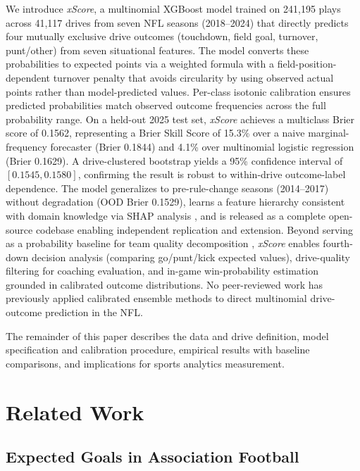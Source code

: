 \documentclass[12pt,a4paper]{article}
\newcommand{\xscore}{\textit{xScore}}
\begin{document}
We introduce \xscore{}, a multinomial XGBoost model trained on 241,195 plays across 41,117 drives from seven NFL seasons (2018--2024) that directly predicts four mutually exclusive drive outcomes (touchdown, field goal, turnover, punt/other) from seven situational features. The model converts these probabilities to expected points via a weighted formula with a field-position-dependent turnover penalty that avoids circularity by using observed actual points rather than model-predicted values. Per-class isotonic calibration ensures predicted probabilities match observed outcome frequencies across the full probability range. On a held-out 2025 test set, \xscore{} achieves a multiclass Brier score of 0.1562, representing a Brier Skill Score of 15.3\% over a naive marginal-frequency forecaster (Brier 0.1844) and 4.1\% over multinomial logistic regression (Brier 0.1629). A drive-clustered bootstrap yields a 95\% confidence interval of $[0.1545, 0.1580]$, confirming the result is robust to within-drive outcome-label dependence. The model generalizes to pre-rule-change seasons (2014--2017) without degradation (OOD Brier 0.1529), learns a feature hierarchy consistent with domain knowledge via SHAP analysis \citep{lundberg2017shap}, and is released as a complete open-source codebase enabling independent replication and extension. Beyond serving as a probability baseline for team quality decomposition \citep{mecha2026gds}, \xscore{} enables fourth-down decision analysis (comparing go/punt/kick expected values), drive-quality filtering for coaching evaluation, and in-game win-probability estimation grounded in calibrated outcome distributions. No peer-reviewed work has previously applied calibrated ensemble methods to direct multinomial drive-outcome prediction in the NFL.

The remainder of this paper describes the data and drive definition, model specification and calibration procedure, empirical results with baseline comparisons, and implications for sports analytics measurement.

\section{Related Work}
\label{sec:related-work}

\subsection{Expected Goals in Association Football}
\end{document}
